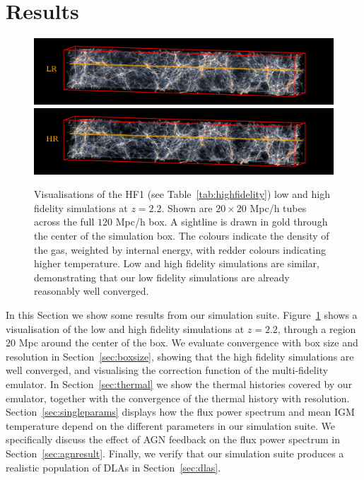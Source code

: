 \documentclass[a4paper,11pt]{article}
\begin{document}
\section{Results}
\begin{figure}
\includegraphics[width=1.0\textwidth]{figures/lr_lya_tube_20mpc.pdf}
\includegraphics[width=1.0\textwidth]{figures/hr_lya_tube_20mpc.pdf}
 \caption{Visualisations of the HF1 (see Table~\protect\ref{tab:highfidelity}) low and high fidelity simulations at $z=2.2$. Shown are $20\times 20$ Mpc/h tubes across the full $120$ Mpc/h box. A sightline is drawn in gold through the center of the simulation box. The colours indicate the density of the gas, weighted by internal energy, with redder colours indicating higher temperature. Low and high fidelity simulations are similar, demonstrating that our low fidelity simulations are already reasonably well converged.}
 \label{fig:visualisation}
\end{figure}

In this Section we show some results from our simulation suite. Figure~\ref{fig:visualisation} shows a visualisation of the low and high fidelity simulations at $z=2.2$, through a region $20$ Mpc around the center of the box. We evaluate convergence with box size and resolution in Section~\ref{sec:boxsize}, showing that the high fidelity simulations are well converged, and visualising the correction function of the multi-fidelity emulator. In Section~\ref{sec:thermal} we show the thermal histories covered by our emulator, together with the convergence of the thermal history with resolution. Section~\ref{sec:singleparams} displays how the flux power spectrum and mean IGM temperature depend on the different parameters in our simulation suite. We specifically discuss the effect of AGN feedback on the flux power spectrum in Section~\ref{sec:agnresult}. Finally, we verify that our simulation suite produces a realistic population of DLAs in Section~\ref{sec:dlas}.
\end{document}
